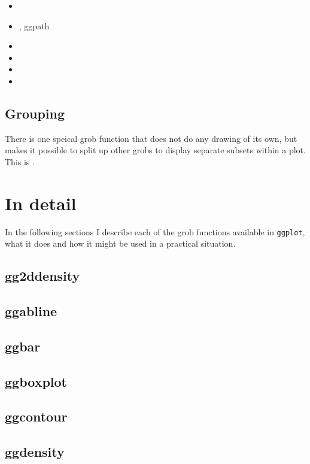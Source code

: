 \begin{itemize}
  \item {}
  \item {}, ggpath
  \item {}
  \item {}
  \item {}
  \item {}
\end{itemize}

\subsection{Grouping}\label{sub:grouping}

There is one speical grob function that does not do any drawing of its own, but makes it possible to split up other grobs to display separate subsets within a plot.  This is .

\section{In detail}\label{sec:in_detail}

In the following sections I describe each of the grob functions available in {\tt ggplot}, what it does and how it might be used in a practical situation.  

\subsection{gg2ddensity}\label{sub:gg2ddensity}
\subsection{ggabline}\label{sub:ggabline}
\subsection{ggbar}\label{sub:ggbar}
\subsection{ggboxplot}\label{sub:ggboxplot}
\subsection{ggcontour}\label{sub:ggcontour}
\subsection{ggdensity}\label{sub:ggdensity}
